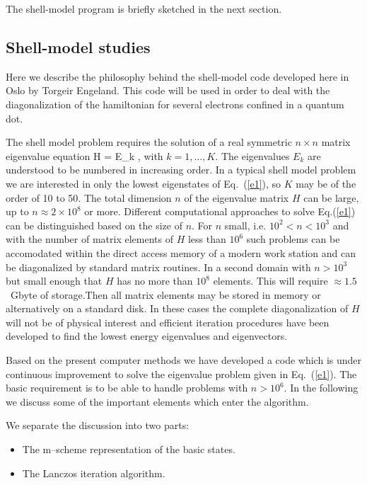 The shell-model program is  briefly sketched 
in the next section.


\subsection*{Shell-model studies}
Here we describe the philosophy behind the shell-model code developed here in Oslo by Torgeir Engeland. This code will be used in order to deal with 
the diagonalization of the hamiltonian for several electrons confined
in a quantum dot. 

The shell model problem requires the solution of a real symmetric
$n \times n$ matrix eigenvalue equation
\be
H = E_k ,
\label{e1}
\ee
with $k = 1,\ldots, K$. The eigenvalues $E_k$ are understood to be
numbered in increasing order. In a typical shell model problem
we are interested in only the lowest eigenstates of Eq.~(\ref{e1}),
so $K$ may be of the order of 10 to 50.
The total dimension $n$ of the eigenvalue matrix $H$ can be large,
up to $n \approx 2 \times 10^{8}$ or more.
Different computational approaches to solve Eq.(\ref{e1}) can
be distinguished
based on the size of $n$.
For $n$ small, i.e. $10^2 < n < 10^3$ and with  the number of
matrix elements of $H$
less than $10^6$ such  problems can be accomodated within the direct
access memory of a modern work station and can be diagonalized by
standard matrix routines.
In a second domain  with  $ n > 10^3$ but small enough that $H$
has no more than $10^8$ elements. This will require $\approx 1.5$~Gbyte
of storage.Then all matrix elements may be stored in memory
or alternatively on a standard disk.
In these cases the complete diagonalization of
$H$ will not be of physical interest and efficient iteration
procedures have been developed to find the lowest energy eigenvalues
and eigenvectors.

Based on the present computer methods we have developed a code
which is under continuous improvement
to solve the eigenvalue problem given in Eq.~(\ref{e1}).
The basic requirement
is to be able to handle problems with $n > 10^6$. In the following
we discuss some of the important elements which enter the algorithm.

We separate the discussion into two parts:
%
\begin{itemize}
%
\item The m--scheme representation of the basic states.
%
\item The Lanczos iteration algorithm.
%
%
\end{itemize}
%
